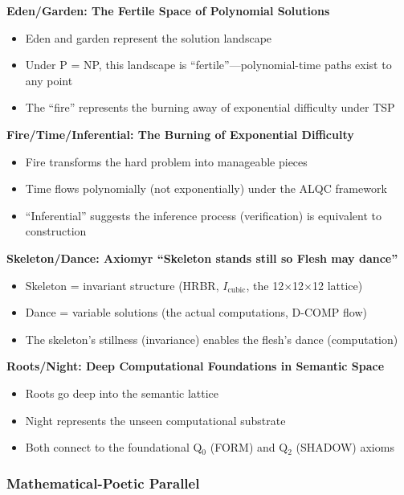 \documentclass[11pt, letterpaper]{article}
\begin{document}
\textbf{Eden/Garden: The Fertile Space of Polynomial Solutions}
\begin{itemize}
    \item Eden and garden represent the solution landscape
    \item Under P = NP, this landscape is ``fertile''—polynomial-time paths exist to any point
    \item The ``fire'' represents the burning away of exponential difficulty under TSP
\end{itemize}

\textbf{Fire/Time/Inferential: The Burning of Exponential Difficulty}
\begin{itemize}
    \item Fire transforms the hard problem into manageable pieces
    \item Time flows polynomially (not exponentially) under the ALQC framework
    \item ``Inferential'' suggests the inference process (verification) is equivalent to construction
\end{itemize}

\textbf{Skeleton/Dance: Axiomyr ``Skeleton stands still so Flesh may dance''}
\begin{itemize}
    \item Skeleton = invariant structure (HRBR, $I_{\text{cubic}}$, the 12$\times$12$\times$12 lattice)
    \item Dance = variable solutions (the actual computations, D-COMP flow)
    \item The skeleton's stillness (invariance) enables the flesh's dance (computation)
\end{itemize}

\textbf{Roots/Night: Deep Computational Foundations in Semantic Space}
\begin{itemize}
    \item Roots go deep into the semantic lattice
    \item Night represents the unseen computational substrate
    \item Both connect to the foundational Q$_0$ (FORM) and Q$_2$ (SHADOW) axioms
\end{itemize}

\subsubsection{Mathematical-Poetic Parallel}
\end{document}
